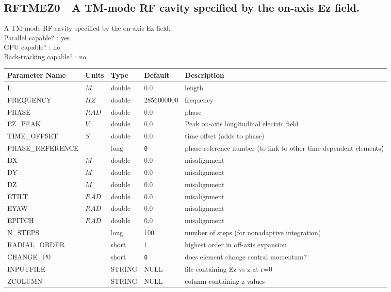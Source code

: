 \subsection{RFTMEZ0---A TM-mode RF cavity specified by the on-axis Ez field.}
A TM-mode RF cavity specified by the on-axis Ez field.
\\
Parallel capable? : yes\\
GPU capable? : no\\
Back-tracking capable? : no\\
\begin{tabular}{|l|l|l|l|p{\descwidth}|} \hline
Parameter Name & Units & Type & Default & Description \\ \hline 
L & $M$ & double &  0.0 & length  \\ \hline 
FREQUENCY & $HZ$ & double &   2856000000 & frequency  \\ \hline 
PHASE & $RAD$ & double &  0.0 & phase  \\ \hline 
EZ\_PEAK & $V$ & double &  0.0 & Peak on-axis longitudinal electric field  \\ \hline 
TIME\_OFFSET & $S$ & double &  0.0 & time offset (adds to phase)  \\ \hline 
PHASE\_REFERENCE &  & long &  \verb|0| & phase reference number (to link to other time-dependent elements)  \\ \hline 
DX & $M$ & double &  0.0 & misalignment  \\ \hline 
DY & $M$ & double &  0.0 & misalignment  \\ \hline 
DZ & $M$ & double &  0.0 & misalignment  \\ \hline 
ETILT & $RAD$ & double &  0.0 & misalignment  \\ \hline 
EYAW & $RAD$ & double &  0.0 & misalignment  \\ \hline 
EPITCH & $RAD$ & double &  0.0 & misalignment  \\ \hline 
N\_STEPS &  & long &   100             & number of steps (for nonadaptive integration)  \\ \hline 
RADIAL\_ORDER &  & short &   1               & highest order in off-axis expansion  \\ \hline 
CHANGE\_P0 &  & short &  \verb|0| & does element change central momentum?  \\ \hline 
INPUTFILE &  & STRING &   NULL            & file containing Ez vs z at r=0  \\ \hline 
ZCOLUMN &  & STRING &   NULL            & column containing z values  \\ \hline 

\end{tabular}
